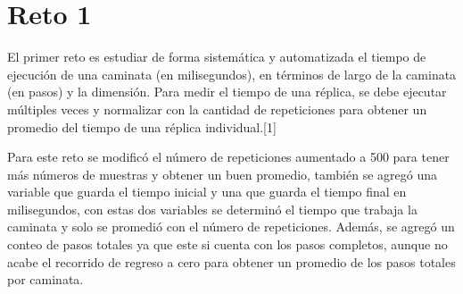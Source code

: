 \documentclass{article}
\begin{document}
\section{Reto 1}

El primer reto es estudiar de forma sistemática y automatizada el tiempo de ejecución de una caminata (en milisegundos), en términos de largo de la caminata (en pasos) y la dimensión. Para medir el tiempo de una réplica, se debe ejecutar múltiples veces y normalizar con la cantidad de repeticiones para obtener un promedio del tiempo de una réplica individual.[1]

Para este reto se modificó el número de repeticiones aumentado a 500 para tener más números de muestras y obtener un buen promedio, también se agregó una variable que guarda el tiempo inicial y una que guarda el tiempo final en milisegundos, con estas dos variables se determinó el tiempo que trabaja la caminata y solo se promedió con el número de repeticiones.
Además, se agregó un conteo de pasos totales ya que este si cuenta con los pasos completos, aunque no acabe el recorrido de regreso a cero para obtener un promedio de los pasos totales por caminata.
\end{document}
